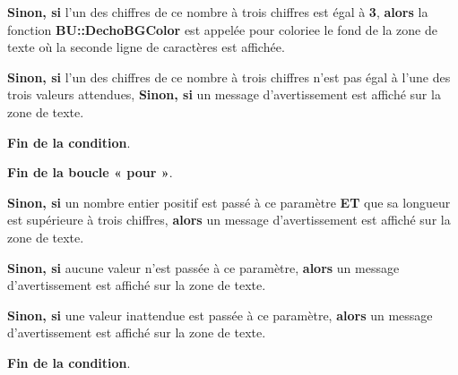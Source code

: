 \documentclass[a4paper,10pt]{article}
\begin{document}
\begin{itemize}
{\begin{justify}
{\begin{itemize}
{                        \begin{justify}
                            \textbf{\color{brick}Sinon, si} l'un des chiffres de ce nombre à trois chiffres est égal à \textbf{3}, \textbf{\color{brick}alors} la fonction \textbf{\color{mauve}BU::DechoBGColor} est appelée pour coloriee le fond de la zone de texte où la seconde ligne de caractères est affichée.
                        \end{justify}\setlength{\parskip}{1em}

                        \begin{justify}
                            \textbf{\color{brick}Sinon, si} l'un des chiffres de ce nombre à trois chiffres n'est pas égal à l'une des trois valeurs attendues, \textbf{\color{brick}Sinon, si} un message d'avertissement est affiché sur la zone de texte.
                        \end{justify}\setlength{\parskip}{1em}

                        \begin{justify}
                            \textbf{\color{brick}Fin de la condition}.
                        \end{justify}
                    }
                \end{itemize}

                \begin{justify}
                    \textbf{\color{cyan}Fin de la boucle « pour »}.
                \end{justify}
            }
        \end{justify}

        \item
        {
            \begin{justify}
                \textbf{\color{brick}Sinon, si} un nombre entier positif est passé à ce paramètre \textbf{ET} que sa longueur est supérieure à trois chiffres, \textbf{\color{brick}alors} un message d'avertissement est affiché sur la zone de texte.
            \end{justify}

            \setlength{\parskip}{1em}

            \begin{justify}
                \textbf{\color{brick}Sinon, si} aucune valeur n'est passée à ce paramètre, \textbf{\color{brick}alors} un message d'avertissement est affiché sur la zone de texte.
            \end{justify}

            \begin{justify}
                \textbf{\color{brick}Sinon, si} une valeur inattendue est passée à ce paramètre, \textbf{\color{brick}alors} un message d'avertissement est affiché sur la zone de texte.
            \end{justify}

            \begin{justify}
                \textbf{\color{brick}Fin de la condition}.
            \end{justify}
        }
    }
\end{itemize}
\end{document}
